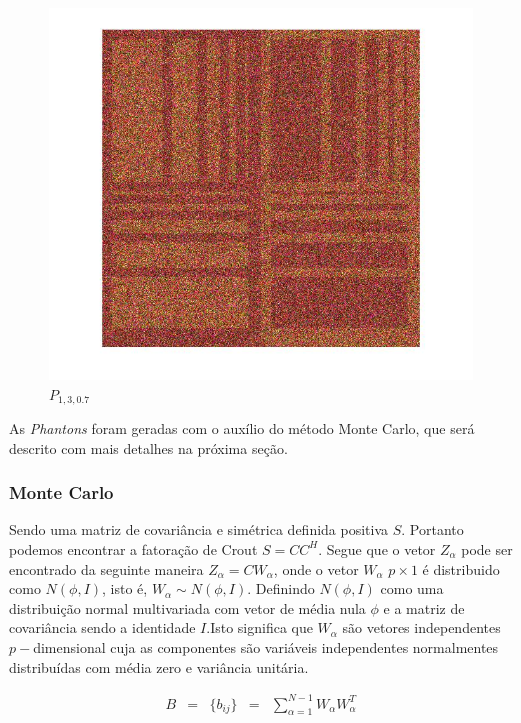 \documentclass[12pt,a4paper]{article}
\begin{document}
\begin{figure}[!htb]
  \includegraphics[width=\linewidth]{Eq_Phantom_0p700_1_3_1.jpg}
	\caption{ $P_{1,3,0.7}$}\label{fig:awesome_image1}
\endminipage
\end{figure}

As {\it Phantons} foram geradas com o auxílio do método Monte Carlo, que será descrito com mais detalhes na próxima seção.

\subsubsection{Monte Carlo \cite{odell1966}}

Sendo uma matriz de covariância e simétrica definida positiva $S$. Portanto podemos encontrar a fatoração de Crout $S=CC^H$. Segue que o vetor $Z_{\alpha}$ pode ser encontrado da seguinte maneira $Z_{\alpha}=CW_{\alpha}$, onde o vetor $W_{\alpha}$ $p\times 1$ é distribuido como $N(\phi,I)$, isto é, $W_{\alpha}\sim N(\phi,I)$. Definindo $N(\phi,I)$ como uma distribuição normal multivariada com vetor de média nula $\phi$ e a matriz de covariância sendo a identidade $I$.Isto significa que $W_{\alpha}$ são vetores independentes $p-$dimensional cuja as componentes são variáveis independentes normalmentes distribuídas com média zero e variância unitária. 

\begin{equation}\label{eqn118}
\begin{array}{ccccc}
	B&=&\{b_{ij}\}&=&\sum_{\alpha=1}^{N-1}W_{\alpha}W_{\alpha}^{T} \\
\end{array}
\end{equation}
\end{document}
